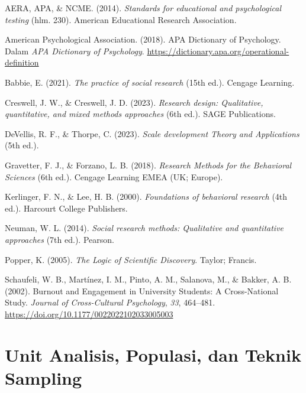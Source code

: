 \documentclass[
  indonesian,
  letterpaper,
  DIV=11,
  numbers=noendperiod]{scrreprt}
\newlength{\cslhangindent}
\newenvironment{CSLReferences}[2] %
 {\begin{list}{}{%
  \setlength{\itemindent}{0pt}
  \setlength{\leftmargin}{0pt}
  \setlength{\parsep}{0pt}
  \ifodd #1
   \setlength{\leftmargin}{\cslhangindent}
   \setlength{\itemindent}{-1\cslhangindent}
  \fi
  \setlength{\itemsep}{#2\baselineskip}}}
 {\end{list}}
\begin{document}
\label{refs--10}
\begin{CSLReferences}{1}{0}
AERA, APA, \& NCME. (2014). \emph{Standards for educational and
psychological testing} (hlm. 230). American Educational Research
Association.

American Psychological Association. (2018). APA Dictionary of
Psychology. Dalam \emph{APA Dictionary of Psychology}.
\url{https://dictionary.apa.org/operational-definition}

Babbie, E. (2021). \emph{The practice of social research} (15th ed.).
Cengage Learning.

Creswell, J. W., \& Creswell, J. D. (2023). \emph{Research design:
Qualitative, quantitative, and mixed methods approaches} (6th ed.). SAGE
Publications.

DeVellis, R. F., \& Thorpe, C. (2023). \emph{Scale development Theory
and Applications} (5th ed.).

Gravetter, F. J., \& Forzano, L. B. (2018). \emph{Research Methods for
the Behavioral Sciences} (6th ed.). Cengage Learning EMEA (UK; Europe).

Kerlinger, F. N., \& Lee, H. B. (2000). \emph{Foundations of behavioral
research} (4th ed.). Harcourt College Publishers.

Neuman, W. L. (2014). \emph{Social research methods: Qualitative and
quantitative approaches} (7th ed.). Pearson.

Popper, K. (2005). \emph{The Logic of Scientific Discovery}. Taylor;
Francis.

Schaufeli, W. B., Martínez, I. M., Pinto, A. M., Salanova, M., \&
Bakker, A. B. (2002). Burnout and Engagement in University Students: A
Cross-National Study. \emph{Journal of Cross-Cultural Psychology},
\emph{33}, 464--481. \url{https://doi.org/10.1177/0022022102033005003}

\end{CSLReferences}

\chapter{Unit Analisis, Populasi, dan Teknik
Sampling}\label{unit-analisis-populasi-dan-teknik-sampling}
\end{document}
